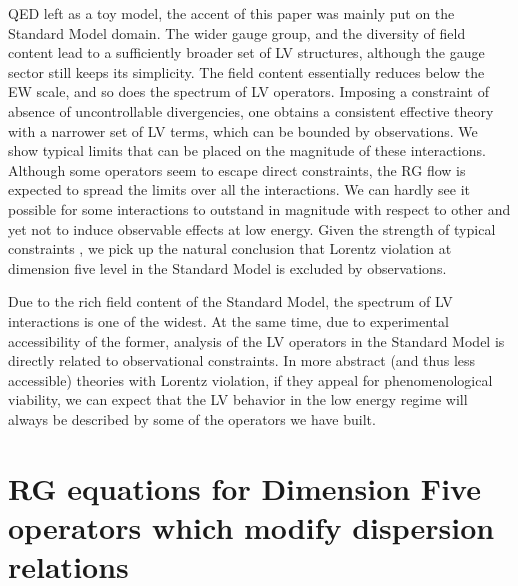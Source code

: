 \documentclass[12pt,preprintnumbers,nofootinbib]{revtex4}
\begin{document}
	QED left as a toy model,
	the accent of this paper was mainly put on the Standard Model 
	domain.
	The wider gauge group, and the diversity of field content lead
	to a sufficiently broader set of LV structures, although the gauge
	sector still keeps its simplicity.
	The field content essentially reduces below the EW scale,
	and so does the spectrum of LV operators.
	Imposing a constraint of absence of uncontrollable divergencies,
	one obtains a consistent effective theory with a narrower set of LV terms, which 
	can be bounded by observations.
	We show typical limits that can be placed on the magnitude of these
	interactions.
	Although some operators seem to escape direct constraints, the RG
	flow is expected to spread the limits over all the interactions.
	We can hardly see it possible for some interactions to outstand in magnitude 
	with respect to other and yet not to induce observable effects at low
	energy. 
	Given the strength of typical constraints 
\cite{Gagnon:2004xh}, we pick up the natural 
	conclusion that Lorentz violation at dimension five level in the Standard
	Model is excluded by observations.

	Due to the rich field content of the Standard Model,
	the spectrum of LV interactions is one of the widest.
	At the same time, due to experimental accessibility of the
	former, analysis of the LV operators in the
	Standard Model is directly related to observational constraints.
	In more abstract (and thus less accessible) theories with Lorentz violation, 
	if they appeal for phenomenological
	viability, we can expect that the LV behavior in the low energy regime will 
	always be described by some of the operators we have built.


\newpage
%
%
\appendix
\section{RG equations for Dimension Five operators which modify dispersion relations}
\label{RG_SM}
\end{document}
